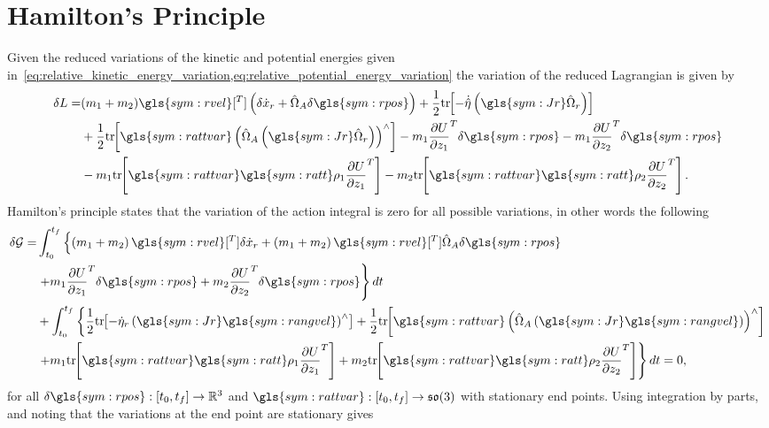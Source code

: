 \section{Hamilton's Principle}\label{sec:relative_hamiltons_principle}

Given the reduced variations of the kinetic and potential energies given in~\cref{eq:relative_kinetic_energy_variation,eq:relative_potential_energy_variation} the variation of the reduced Lagrangian is given by
\begin{align*}
    \delta L =& (m_1 + m_2) \gls{sym:rvel}[^T] \parenth{\delta \dot{x}_r +  \hat{\Omega}_A \delta \gls{sym:rpos}} + \frac{1}{2} \tr{ -\dot{\hat{\eta}}\parenth{\gls{sym:Jr}  \hat{\Omega}_r }} \nonumber\\
    &+\frac{1}{2} \tr{\gls{sym:rattvar}\parenth{ \hat{\Omega}_A\parenth{\gls{sym:Jr}  \hat{\Omega}_r}}^\wedge} -m_1 \deriv{U}{z_1}^T \delta \gls{sym:rpos} - m_1 \deriv{U}{z_2}^T \delta \gls{sym:rpos} \nonumber\\
    &- m_1 \tr{ \gls{sym:rattvar} \gls{sym:ratt} \rho_1 \deriv{U}{z_1}^T} - m_2 \tr{\gls{sym:rattvar} \gls{sym:ratt} \rho_2 \deriv{U}{z_2}^T}.
\end{align*}
Hamilton's principle states that the variation of the action integral is zero for all possible variations, in other words the following
\begin{align}\label{eq:relative_hamiltons_principle_1}
    \delta \mathcal{G} =& \int_{t_0}^{t_f} \left\{\parenth{m_1+m_2} \gls{sym:rvel}[^T] \delta \dot{x}_r + \parenth{m_1 + m_2} \gls{sym:rvel}[^T] \hat{\Omega}_A \delta \gls{sym:rpos}\right. \nonumber\\
                        & \left.+ m_1 \deriv{U}{z_1}^T \delta \gls{sym:rpos} + m_2 \deriv{U}{z_2}^T \delta \gls{sym:rpos} \right\} dt \nonumber\\
                        & +\int_{t_0}^{t_f} \left\{ \frac{1}{2} \tr{-\dot{\eta}_r \parenth{\gls{sym:Jr} \gls{sym:rangvel}}^\wedge }  + \frac{1}{2} \tr{\gls{sym:rattvar} \parenth{\hat{\Omega}_A \parenth{\gls{sym:Jr}\gls{sym:rangvel}}}^\wedge}\right. \nonumber\\
                        & \left.+ m_1 \tr{\gls{sym:rattvar}\gls{sym:ratt}\rho_1\deriv{U}{z_1}^T} + m_2 \tr{\gls{sym:rattvar}\gls{sym:ratt}\rho_2\deriv{U}{z_2}^T}\right\} dt = 0,
\end{align}
for all \( \delta \gls{sym:rpos} : \bracket{t_0, t_f} \to \R^3 \) and \( \gls{sym:rattvar} : \bracket{t_0, t_f} \to \so \) with stationary end points.
Using integration by parts, and noting that the variations at the end point are stationary gives
